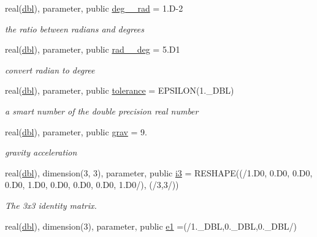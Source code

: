 \begin{DoxyCompactItemize}
\item 
real(\hyperlink{namespaceglobaldatafun_a5008801201dd34f2af8eae07756befb4}{dbl}), parameter, public \hyperlink{namespaceglobaldatafun_a6cd96b1c5754b6f19020fd2ff826086d}{deg\+\_\+\_\+rad} = 1.\+D-\/2
\begin{DoxyCompactList}\small\item\em the ratio between radians and degrees \end{DoxyCompactList}\item 
real(\hyperlink{namespaceglobaldatafun_a5008801201dd34f2af8eae07756befb4}{dbl}), parameter, public \hyperlink{namespaceglobaldatafun_a65560765d885097ca1432983f9cf6bab}{rad\+\_\+\_\+deg} = 5.\+D1
\begin{DoxyCompactList}\small\item\em convert radian to degree \end{DoxyCompactList}\item 
real(\hyperlink{namespaceglobaldatafun_a5008801201dd34f2af8eae07756befb4}{dbl}), parameter, public \hyperlink{namespaceglobaldatafun_a163afcd0caf3537efef266782e451784}{tolerance} = E\+P\+S\+I\+L\+ON(1.\+\_\+\+D\+B\+L)
\begin{DoxyCompactList}\small\item\em a smart number of the double precision real number \end{DoxyCompactList}\item 
real(\hyperlink{namespaceglobaldatafun_a5008801201dd34f2af8eae07756befb4}{dbl}), parameter, public \hyperlink{namespaceglobaldatafun_a6ddc394879657b50856a10648f3af6bd}{grav} = 9.
\begin{DoxyCompactList}\small\item\em gravity acceleration \end{DoxyCompactList}\item 
real(\hyperlink{namespaceglobaldatafun_a5008801201dd34f2af8eae07756befb4}{dbl}), dimension(3, 3), parameter, public \hyperlink{namespaceglobaldatafun_abe3df2088f071e903ebdcf4734f6dc27}{i3} = R\+E\+S\+H\+A\+PE((/1.D0, 0.D0, 0.D0, 0.D0, 1.D0, 0.D0, 0.D0, 0.D0, 1.D0/), (/3,3/))
\begin{DoxyCompactList}\small\item\em The 3x3 identity matrix. \end{DoxyCompactList}\item 
real(\hyperlink{namespaceglobaldatafun_a5008801201dd34f2af8eae07756befb4}{dbl}), dimension(3), parameter, public \hyperlink{namespaceglobaldatafun_ae724ce0d8db999ac46505601fee29b3a}{e1} =(/1.\+\_\+\+D\+BL,0.\+\_\+\+D\+BL,0.\+\_\+\+D\+BL/)

\end{DoxyCompactItemize}
